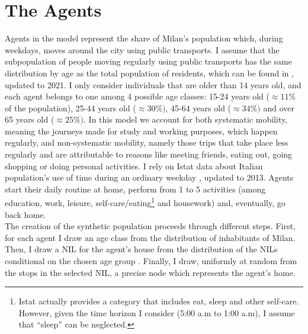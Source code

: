 
 \section{The Agents}\label{sec:3.3}
 
Agents in the model represent the share of Milan's population which, during weekdays, moves around the city using public transports. I assume that the subpopulation of people moving regularly using public transports has the same distribution by age as the total population of residents, which can be found in \cite{site18}, updated to 2021. I only consider individuals that are older than 14 years old, and each agent belongs to one among 4 possible age classes: 15-24 years old ($\approx 11\%$ of the population), 25-44 years old ($\approx 30\%)$, 45-64 years old ($\approx 34\%)$ and over 65 years old ($\approx 25\%)$.
In this model we account for both systematic mobility, meaning the journeys made for study and working purposes, which happen regularly, and non-systematic mobility, namely those trips that take place less regularly and are attributable to reasons like meeting friends, eating out, going shopping or doing personal activities. I rely on Istat data about Italian population's use of time during an ordinary weekday \cite{site14}, updated to 2013. Agents start their daily routine at home, perform from 1 to 5 activities (among education, work, leisure, self-care/eating\footnote{Istat actually provides a category that includes eat, sleep and other self-care. However, given the time horizon I consider (5:00 a.m  to 1:00 a.m), I assume that “sleep” can be neglected.} and housework) and, eventually, go back home. \\
The creation of the synthetic population proceeds through different steps. First, for each agent I draw an age class from the distribution of inhabitants of Milan. Then, I draw a NIL for the agent's house from the distribution of the NILs conditional on the chosen age group \cite{site18}. Finally, I draw, uniformly at random from the stops in the selected NIL, a precise node which represents the agent’s home. 

